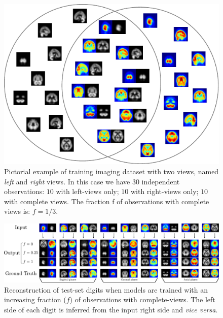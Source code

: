\begin{figure}[!h]
\centering
\includegraphics[width=0.8\columnwidth]{./tex/fig/nimg_scheme.pdf}
\caption{
	Pictorial example of training imaging dataset with two views, named \textit{left} and \textit{right} views.
	In this case we have 30 independent observations:
	$10$ with left-views only; $10$ with right-views only; $10$ with complete views.
	The fraction f of observations with complete views is:
	$f = 1/3$.
}
\label{fig:nimg_scheme}
\end{figure}
%
\begin{figure}[!h]
\centering
\includegraphics[width=\columnwidth]{./tex/fig/nimg_test.pdf}
\caption{
	Reconstruction of test-set digits when models are trained with an increasing fraction ($f$) of observations with complete-views.
	The left side of each digit is inferred from the input right side and \textit{vice versa}.
}
\label{fig:nimg_test}
\end{figure}
